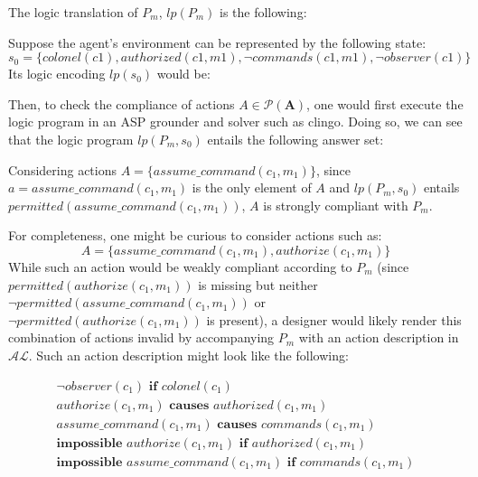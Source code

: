 The logic translation of $P_m$, $lp(P_m)$ is the following:


Suppose the agent's environment can be represented by the following state:
\begin{equation}
    s_0 = \{colonel(c1), authorized(c1,m1), \neg commands(c1,m1), \neg observer(c1) \}
\end{equation}
Its logic encoding $lp(s_0)$ would be:


Then, to check the compliance of actions $A \in \mathcal{P}(\boldsymbol{A})$, one would first execute the logic program in an ASP grounder and solver such as clingo.
Doing so, we can see that the logic program $lp(P_m, s_0)$ entails the following answer set:


Considering actions $A=\{assume\_command(c_1, m_1)\}$, since $a = assume\_command(c_1, m_1)$ is the only element of $A$ and $lp(P_m, s_0)$ entails $permitted(assume\_command(c_1, m_1))$, $A$ is strongly compliant with $P_m$.

For completeness, one might be curious to consider actions such as:
\begin{equation}
    A = \{assume\_command(c_1, m_1), authorize(c_1, m_1)\}
\end{equation}
While such an action would be weakly compliant according to $P_m$ (since $permitted(authorize(c_1, m_1))$ is missing but neither $\neg permitted(assume\_command(c_1, m_1))$ or $\neg permitted(authorize(c_1, m_1))$ is present), a designer would likely render this combination of actions invalid by accompanying $P_m$ with an action description in $\mathcal{AL}$.
Such an action description might look like the following:

\begin{gather}
    \neg observer(c_1) \textbf{ if } colonel(c_1) \label{eq:apl_action_description_5} \\
    authorize(c_1, m_1) \textbf{ causes } authorized(c_1, m_1) \label{eq:apl_action_description_1} \\
    assume\_command(c_1, m_1) \textbf{ causes } commands(c_1, m_1) \label{eq:apl_action_description_2} \\
    \textbf{impossible } authorize(c_1, m_1) \textbf{ if } authorized(c_1, m_1) \label{eq:apl_action_description_3} \\
    \textbf{impossible } assume\_command(c_1, m_1) \textbf{ if } commands(c_1, m_1) \label{eq:apl_action_description_4}
\end{gather}


